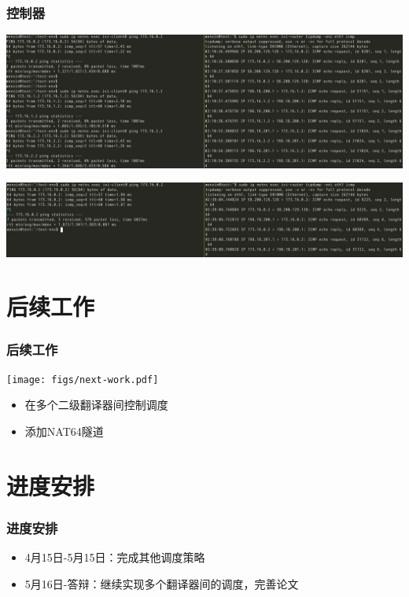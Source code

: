 \documentclass{beamer}
\begin{document}
\begin{frame}
  \frametitle{控制器}

  \begin{center}
    \includegraphics[width=\textwidth]{figs/static.jpeg}
  \end{center}

  \begin{center}
    \includegraphics[width=\textwidth]{figs/round-robin.jpeg}  
  \end{center}
  
\end{frame}

\section{后续工作}
\begin{frame}
  \frametitle{后续工作}

  \begin{center}
    \texttt{[image: figs/next-work.pdf]}  
  \end{center}
  \begin{block}{}
    \begin{itemize}
    \item 在多个二级翻译器间控制调度
    \item 添加NAT64隧道
    \end{itemize}
  \end{block}
\end{frame}

\section{进度安排}

\begin{frame}
  \frametitle{进度安排}
  \begin{block}{}
    \begin{itemize}
    \item 4月15日-5月15日：完成其他调度策略
    \item 5月16日-答辩：继续实现多个翻译器间的调度，完善论文
    \end{itemize}
  \end{block}
\end{frame}
\end{document}
